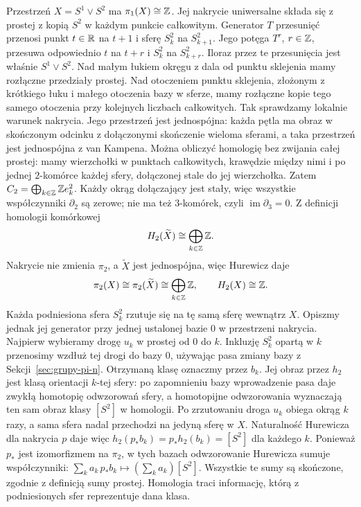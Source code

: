 \begin{przyklad}
\label{prz:pi-bukiet-pokrycie}
Przestrzeń
$X=S^1\vee S^2$
ma $\pi_1(X)\cong\mathbb{Z}$.
Jej nakrycie uniwersalne
składa się z prostej
z kopią $S^2$ w każdym
punkcie całkowitym.
Generator $T$ przesunięć przenosi punkt $t\in\mathbb{R}$ na $t+1$
i sferę $S_k^2$ na $S_{k+1}^2$. Jego potęga $T^r$, $r\in\mathbb{Z}$,
przesuwa odpowiednio $t$ na $t+r$ i $S_k^2$ na $S_{k+r}^2$.
Iloraz przez te przesunięcia jest właśnie $S^1\vee S^2$.
Nad małym łukiem okręgu z dala od punktu sklejenia mamy
rozłączne przedziały prostej. Nad otoczeniem punktu sklejenia,
złożonym z krótkiego łuku i małego otoczenia bazy w sferze,
mamy rozłączne kopie tego samego otoczenia przy kolejnych liczbach
całkowitych. Tak sprawdzamy lokalnie warunek nakrycia.
Jego przestrzeń jest jednospójna: każda pętla ma obraz
w skończonym odcinku z dołączonymi skończenie wieloma sferami,
a taka przestrzeń jest jednospójna z van Kampena.
Można obliczyć homologię bez zwijania całej prostej:
mamy wierzchołki w punktach całkowitych, krawędzie między nimi
i po jednej $2$-komórce każdej sfery, dołączonej stale do jej wierzchołka.
Zatem $C_2=\bigoplus_{k\in\mathbb{Z}}\mathbb{Z} e_k^2$.
Każdy okrąg dołączający jest stały, więc wszystkie współczynniki
$\partial_2$ są zerowe; nie ma też $3$-komórek, czyli
$\operatorname{im}\partial_3=0$.
Z definicji homologii komórkowej
\[
 H_2(\widetilde X)
 \cong\bigoplus_{k\in\mathbb{Z}}\mathbb{Z}.
\]
Nakrycie nie zmienia
$\pi_2$, a
$\widetilde X$
jest jednospójna,
więc Hurewicz daje
\[
 \pi_2(X)\cong
 \pi_2(\widetilde X)
 \cong\bigoplus_{k\in\mathbb{Z}}\mathbb{Z},
 \qquad
 H_2(X)\cong\mathbb{Z}.
\]
Każda podniesiona
sfera $S_k^2$
rzutuje się
na tę samą sferę
wewnątrz $X$.
Opiszmy jednak jej generator przy jednej ustalonej bazie $0$
w przestrzeni nakrycia. Najpierw wybieramy drogę $u_k$ w prostej
od $0$ do $k$. Inkluzję $S_k^2$ opartą w $k$ przenosimy
wzdłuż tej drogi do bazy $0$, używając pasa zmiany bazy
z Sekcji~\ref{sec:grupy-pi-n}. Otrzymaną klasę oznaczmy przez $b_k$.
Jej obraz przez $h_2$ jest klasą orientacji $k$-tej sfery:
po zapomnieniu bazy wprowadzenie pasa daje zwykłą homotopię
odwzorowań sfery, a homotopijne odwzorowania wyznaczają
ten sam obraz klasy $[S^2]$ w homologii.
Po zrzutowaniu droga $u_k$ obiega okrąg $k$ razy, a sama sfera
nadal przechodzi na jedyną sferę w $X$.
Naturalność Hurewicza dla nakrycia $p$ daje więc
$h_2(p_*b_k)=p_*h_2(b_k)=[S^2]$ dla każdego $k$.
Ponieważ $p_*$ jest izomorfizmem na $\pi_2$, w tych bazach
odwzorowanie Hurewicza sumuje współczynniki:
$\sum_k a_k\,p_*b_k\mapsto(\sum_k a_k)[S^2]$.
Wszystkie te sumy są skończone, zgodnie z definicją sumy prostej.
Homologia traci
informację, którą
z podniesionych
sfer reprezentuje
dana klasa.
\end{przyklad}

